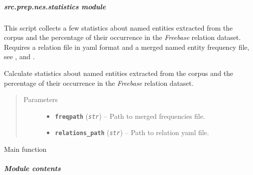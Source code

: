 \documentclass[letterpaper,10pt,english]{sphinxmanual}
\begin{document}
\subparagraph{src.prep.nes.statistics module}
\label{src.prep.nes:src-prep-nes-statistics-module}\label{src.prep.nes:module-src.prep.nes.statistics}
This script collects a few statistics about named entities extracted from the corpus and the percentage of their
occurrence in the \emph{Freebase} relation dataset.
Requires a relation file in yaml format and a merged named entity frequency file, see ,
 and  .

\begin{fulllineitems}
\label{src.prep.nes:src.prep.nes.statistics.calculate_occurrences}
Calculate statistics about named entities extracted from the corpus and the percentage of their
occurrence in the \emph{Freebase} relation dataset.
\begin{quote}\begin{description}
\item[{Parameters}] \leavevmode\begin{itemize}
\item {} 
\textbf{\texttt{freqpath}} (\emph{\texttt{str}}) -- Path to merged frequencies file.

\item {} 
\textbf{\texttt{relations\_path}} (\emph{\texttt{str}}) -- Path to relation yaml file.

\end{itemize}

\end{description}\end{quote}

\end{fulllineitems}


\begin{fulllineitems}
\label{src.prep.nes:src.prep.nes.statistics.main}
Main function

\end{fulllineitems}



\subparagraph{Module contents}
\label{src.prep.nes:module-src.prep.nes}\label{src.prep.nes:module-contents}
\end{document}
